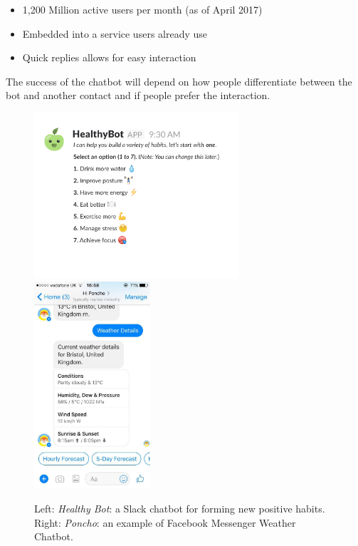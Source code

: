 \begin{itemize}
  \item 1,200 Million active users per month (as of April 2017)~\cite{fb_messenger_stats}
  \item Embedded into a service users already use
  \item Quick replies allows for easy interaction
\end{itemize}

The success of the chatbot will depend on how people differentiate between the bot and another contact and if people prefer the interaction.

\begin{figure}[H]
  \centering
  \includegraphics[width=3in]{../resources/existing-bots/healthy-bot.png}
  \hspace{10px}
  \includegraphics[width=1.7in]{../resources/existing-bots/poncho.jpg}
  \caption{Left: \textit{Healthy Bot}: a Slack chatbot for forming new positive habits. Right: \textit{Poncho}: an example of Facebook Messenger Weather Chatbot.}
  \label{fig:healthy_bot_and_poncho}
\end{figure}

